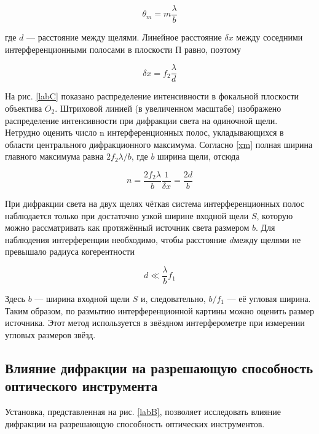 \documentclass[a4paper,12pt]{article}
\begin{document}
\begin{equation}\label{}
\theta_m = m \dfrac{\lambda}{b}
\end{equation}

где $ d $ --- расстояние между щелями. Линейное расстояние $ \delta x $ между соседними интерференционными полосами в плоскости П равно, поэтому

\begin{equation}\label{dx}
\delta x = f_2 \dfrac{\lambda}{d}
\end{equation}

На рис. \ref{labC} показано распределение интенсивности в фокальной плоскости объектива $ O_2 $. Штриховой линией (в увеличенном масштабе)
изображено распределение интенсивности при дифракции света на одиночной щели. Нетрудно оценить число n интерференционных полос,
укладывающихся в области центрального дифракционного максимума.
Согласно \eqref{xm} полная ширина главного максимума равна $ 2 f_2 \lambda /b $, где $ b $ ширина щели, отсюда

\begin{equation}\label{n}
n = \dfrac{2f_2 \lambda}{b} \dfrac{1}{\delta x} = \dfrac{2d}{b}
\end{equation}

При дифракции света на двух щелях чёткая система интерференционных полос наблюдается только при достаточно узкой ширине входной щели $ S $, которую можно рассматривать как протяжённый источник света размером $ b $. Для наблюдения интерференции необходимо, чтобы расстояние $ d $между щелями не превышало радиуса когерентности

\begin{equation}\label{}
d \ll \dfrac{\lambda}{b} f_1
\end{equation}

Здесь $ b $ --- ширина входной щели $ S $ и, следовательно, $  b/f_1 $ --- её угловая ширина. Таким образом, по размытию интерференционной картины можно оценить размер источника. Этот метод используется в звёздном интерферометре при измерении угловых размеров звёзд.

\subsection{Влияние дифракции на разрешающую способность оптического инструмента}

Установка, представленная на рис. \ref{labB}, позволяет исследовать влияние дифракции на разрешающую способность оптических инструментов.
\end{document}
